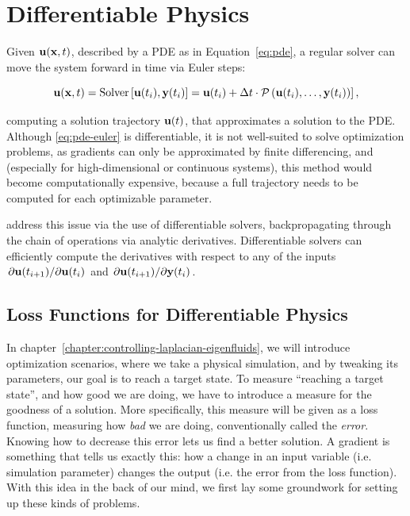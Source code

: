 \section{Differentiable Physics}
Given $\vb{u}(\vb{x}, t)$, described by a \ac{PDE} as in
Equation~\eqref{eq:pde}, a regular solver can move the system forward in time
via Euler steps:

\begin{equation}
\vb{u}(\vb{x},t) = \text{Solver}\left[ \vb{u}(t_i), \vb{y}(t_i)] = 
  \vb{u}(t_i) + \Delta t \cdot \mathcal{P} \left( 
    \vb{u}(t_i), \dots, \vb{y}(t_i)
  \right)
\right],
\label{eq:pde-euler}
\end{equation}

computing a solution trajectory $\vb{u}(t)$, that approximates a solution to the
\ac{PDE}. Although \eqref{eq:pde-euler} is differentiable, it is not well-suited
to solve optimization problems, as gradients can only be approximated by finite
differencing, and (especially for high-dimensional or continuous systems), this
method would become computationally expensive, because a full trajectory needs
to be computed for each optimizable parameter.

\citet{holl2019pdecontrol} address this issue via the use of differentiable
solvers, backpropagating through the chain of operations via analytic
derivatives.  Differentiable solvers can efficiently compute the derivatives
with respect to any of the inputs $\pdv*{\vb{u}(t_{i+1})}{\vb{u}(t_i)}$ and
$\pdv*{\vb{u}(t_{i+1})}{\vb{y}(t_i)}$. 

\subsection{Loss Functions for Differentiable Physics}
\label{dp-loss}
In chapter~\ref{chapter:controlling-laplacian-eigenfluids}, we will introduce
optimization scenarios, where we take a physical simulation, and by tweaking its
parameters, our goal is to reach a target state. To measure ``reaching a target
state'', and how good we are doing, we have to introduce a measure for the
goodness of a solution. More specifically, this measure will be given as a loss
function, measuring how \textit{bad} we are doing, conventionally called the
\textit{error}. Knowing how to decrease this error lets us find a better solution.
A gradient is something that tells us exactly this: how a change in an input
variable (i.e. simulation parameter) changes the output (i.e. the error from the
loss function). With this idea in the back of our mind, we first lay some
groundwork for setting up these kinds of problems.

